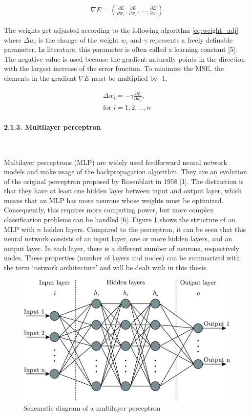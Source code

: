 \documentclass[
]{article}
\begin{document}
\begin{align} \label{eq:gradient_descent}
\nabla{E}=(\frac{\partial E}{\partial w_{1}},
\frac{\partial E}{\partial w_{2}},
\dots,
\frac{\partial E}{\partial w_{i}})
\end{align}

The weights get adjusted according to the following algorithm
\ref{eq:weight_adj} where \(\Delta{w_{i}}\) is the change of the weight
\(w_{i}\) and \(\gamma\) represents a freely definable parameter. In
literature, this parameter is often called a learning constant {[}5{]}.
The negative value is used because the gradient naturally points in the
direction with the largest increase of the error function. To minimize
the MSE, the elements in the gradient \(\nabla{E}\) must be multiplied
by -1.

\begin{align} \label{eq:weight_adj}
\Delta{w_{i}}=-\gamma\frac{\partial E}{\partial w_{i}}, \\
\text{for } i=1,2,\dots,n \nonumber
\end{align}

\newpage

\hypertarget{MLP}{%
\paragraph{2.1.3. Multilayer perceptron}\label{MLP}}

~

Multilayer perceptrons (MLP) are widely used feedforward neural network
models and make usage of the backpropagation algorithm. They are an
evolution of the original perceptron proposed by Rosenblatt in 1958
{[}1{]}. The distinction is that they have at least one hidden layer
between input and output layer, which means that an MLP has more neurons
whose weights must be optimized. Consequently, this requires more
computing power, but more complex classification problems can be handled
{[}6{]}. Figure \ref{fig:mlp_schema} shows the structure of an MLP with
\(n\) hidden layers. Compared to the perceptron, it can be seen that
this neural network consists of an input layer, one or more hidden
layers, and an output layer. In each layer, there is a different number
of neurons, respectively nodes. These properties (number of layers and
nodes) can be summarized with the term `network architecture' and will
be dealt with in this thesis.

\begin{figure}

{\centering \includegraphics[width=0.6\linewidth]{images/MLP} 

}

\caption{Schematic diagram of a multilayer perceptron}\label{fig:mlp_schema}
\end{figure}
\end{document}
